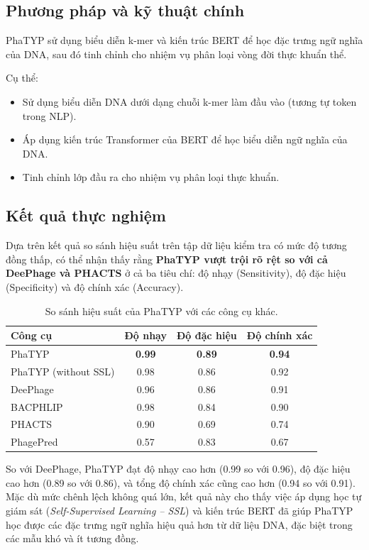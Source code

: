\subsection*{Phương pháp và kỹ thuật chính}
PhaTYP sử dụng biểu diễn k-mer và kiến trúc BERT để học đặc trưng ngữ nghĩa của DNA, sau đó tinh chỉnh cho nhiệm vụ phân loại vòng đời thực khuẩn thể. 

Cụ thể:
\begin{itemize}
    \item Sử dụng biểu diễn DNA dưới dạng chuỗi k-mer làm đầu vào (tương tự token trong NLP).
    \item Áp dụng kiến trúc Transformer của BERT để học biểu diễn ngữ nghĩa của DNA.
    \item Tinh chỉnh lớp đầu ra cho nhiệm vụ phân loại thực khuẩn.
\end{itemize}

\subsection*{Kết quả thực nghiệm}

Dựa trên kết quả so sánh hiệu suất trên tập dữ liệu kiểm tra có mức độ tương đồng thấp, có thể nhận thấy rằng \textbf{PhaTYP vượt trội rõ rệt so với cả DeePhage và PHACTS} ở cả ba tiêu chí: độ nhạy (Sensitivity), độ đặc hiệu (Specificity) và độ chính xác (Accuracy).

\begin{table}[ht]
\centering
\caption{So sánh hiệu suất của PhaTYP với các công cụ khác.}
\label{tab:PhaTPY_Result}
\begin{tabular}{|l|c|c|c|}
\hline
\textbf{Công cụ} & \textbf{Độ nhạy} & \textbf{Độ đặc hiệu} & \textbf{Độ chính xác} \\
\hline
PhaTYP             & \textbf{0.99} & \textbf{0.89} & \textbf{0.94} \\
PhaTYP (without SSL)   & 0.98 & 0.86 & 0.92 \\
DeePhage           & 0.96 & 0.86 & 0.91 \\
BACPHLIP           & 0.98 & 0.84 & 0.90 \\
PHACTS             & 0.90 & 0.69 & 0.74 \\
PhagePred          & 0.57 & 0.83 & 0.67 \\
\hline
\end{tabular}
\end{table}

So với DeePhage, PhaTYP đạt độ nhạy cao hơn (0.99 so với 0.96), độ đặc hiệu cao hơn (0.89 so với 0.86), và tổng độ chính xác cũng cao hơn (0.94 so với 0.91). Mặc dù mức chênh lệch không quá lớn, kết quả này cho thấy việc áp dụng học tự giám sát (\textit{Self-Supervised Learning – SSL}) và kiến trúc BERT đã giúp PhaTYP học được các đặc trưng ngữ nghĩa hiệu quả hơn từ dữ liệu DNA, đặc biệt trong các mẫu khó và ít tương đồng.

